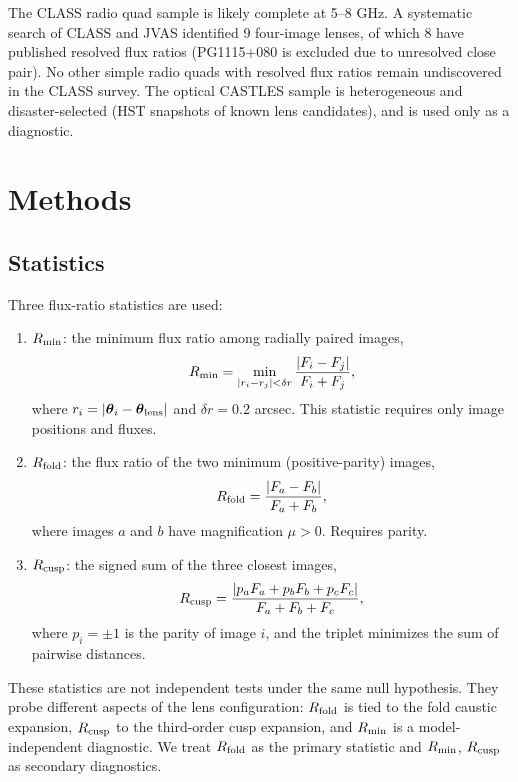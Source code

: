 \documentclass[12pt]{article}
\newcommand{\rfold}{\ensuremath{R_{\rm fold}}}
\newcommand{\rcusp}{\ensuremath{R_{\rm cusp}}}
\newcommand{\rmin}{\ensuremath{R_{\rm min}}}
\begin{document}
The CLASS radio quad sample is likely complete at 5--8 GHz.
A systematic search of CLASS and JVAS \cite{Browne2003} identified 9
four-image lenses, of which 8 have published resolved flux ratios
(PG1115+080 is excluded due to unresolved close pair).
No other simple radio quads with resolved flux ratios remain undiscovered
in the CLASS survey. The optical CASTLES sample is heterogeneous
and disaster-selected (HST snapshots of known lens candidates),
and is used only as a diagnostic.

\clearpage
\section{Methods}
\label{sec:methods}

\subsection{Statistics}
\label{sec:stats}

Three flux-ratio statistics are used:

\begin{enumerate}
\item \textbf{\rmin{}}: the minimum flux ratio among radially paired images,
\begin{equation}
\rmin = \min_{|r_i - r_j| < \delta r} \frac{|F_i - F_j|}{F_i + F_j},
\end{equation}
where $r_i = |\boldsymbol{\theta}_i - \boldsymbol{\theta}_{\rm lens}|$ and
$\delta r = 0.2$ arcsec. This statistic requires only image positions and fluxes.

\item \textbf{\rfold{}}: the flux ratio of the two minimum (positive-parity) images,
\begin{equation}
\rfold = \frac{|F_a - F_b|}{F_a + F_b},
\end{equation}
where images $a$ and $b$ have magnification $\mu > 0$. Requires parity.

\item \textbf{\rcusp{}}: the signed sum of the three closest images,
\begin{equation}
\rcusp = \frac{|p_a F_a + p_b F_b + p_c F_c|}{F_a + F_b + F_c},
\end{equation}
where $p_i = \pm 1$ is the parity of image $i$, and the triplet minimizes
the sum of pairwise distances.
\end{enumerate}

These statistics are not independent tests under the same null hypothesis.
They probe different aspects of the lens configuration: \rfold{} is tied to
the fold caustic expansion, \rcusp{} to the third-order cusp expansion,
and \rmin{} is a model-independent diagnostic.
We treat \rfold{} as the primary statistic and \rmin{}, \rcusp{} as
secondary diagnostics.
\end{document}
